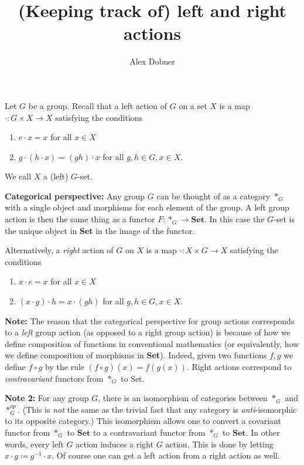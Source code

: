 \documentclass[a4paper,11pt,twoside]{amsart}
\newcommand{\catname}[1]{{\textbf{#1}}}
\theoremstyle{definition}
\begin{document}
\title{(Keeping track of) left and right actions}
\author{Alex Dobner}
\address{Department of Mathematics, University of Michigan \\
530 Church St\\
Ann Arbor, MI 48109}
\maketitle

Let $G$ be a group. Recall that a left action of $G$ on a set $X$ is a map $\cdot \colon G\times X \to X$ satisfying the conditions
\begin{enumerate}
    \item $e \cdot x = x$ for all $x \in X$
    \item $g\cdot (h \cdot x) = (gh)\cdot x$ for all $g,h \in G, x \in X$.
\end{enumerate}
We call $X$ a (left) $G$-set.

\textbf{Categorical perspective: } Any group $G$ can be thought of as a category $\ast_G$ with a single object and morphisms for each element of the group. A left group action is then the same thing as a functor $F \colon \ast_G \to \catname{Set}.$ In this case the $G$-set is the unique object in \catname{Set} in the image of the functor.
\bigskip

Alternatively, a \emph{right} action of $G$ on $X$ is a map $\cdot \colon X \times G \to X$ satisfying the conditions
\begin{enumerate}
    \item $x \cdot e = x$ for all $x \in X$
    \item $(x \cdot g) \cdot h = x \cdot (gh)$ for all $g,h \in G, x \in X$.
\end{enumerate}


\vspace{1em}
\textbf{Note:} The reason that the categorical perspective for group actions corresponds to a \emph{left} group action (as opposed to a right group action) is because of how we define composition of functions in conventional mathematics (or equivalently, how we define composition of morphisms in \catname{Set}). Indeed, given two functions $f,g$ we define $f \circ g$ by the rule $(f \circ g)(x) = f(g(x)).$ Right actions correspond to \emph{contravariant} functors from $\ast_G$ to $\mathrm{Set}.$

\smallskip

\textbf{Note 2:} For any group $G$, there is an isomorphism of categories between $\ast_G$ and $\ast_G^{op}$. (This is \emph{not} the same as the trivial fact that any category is \emph{anti}-isomorphic to its opposite category.) This isomorphism allows one to convert a covariant functor from $\ast_G$ to $\catname{Set}$ to a contravariant functor from $\ast_G$ to $\catname{Set}$. In other words, every left $G$ action induces a right $G$ action. This is done by letting $x \cdot g \coloneqq g^{-1} \cdot x.$  Of course one can get a left action from a right action as well.
\end{document}
